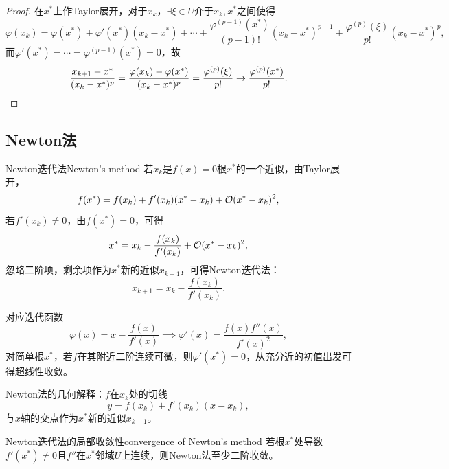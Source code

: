 \begin{proof}
    在$x^*$上作Taylor展开，对于$x_k$，$\exists\xi \in U$介于$x_k,x^*$之间使得
    \[
        \varphi(x_k) = \varphi(x^*) + \varphi'(x^*)(x_k - x^*) + \cdots + \frac{\varphi^{(p-1)}(x^*)}{(p - 1)!}(x_k - x^*)^{p-1} + \frac{\varphi^{(p)}(\xi)}{p!}(x_k - x^*)^p,
    \]
    而$\varphi'(x^*) = \cdots = \varphi^{(p-1)}(x^*) = 0$，故
    \[
        \frac{x_{k+1} - x^*}{(x_k - x^*)^p} = \frac{\varphi(x_k) - \varphi(x^*)}{(x_k - x^*)^p}
        = \frac{\varphi^{(p)}(\xi)}{p!} \to \frac{\varphi^{(p)}(x^*)}{p!}.
        \qedhere
    \]
\end{proof}

\subsection{Newton法}

\begin{theorem}
    {Newton迭代法}{Newton's method}
    若$x_k$是$f(x) = 0$根$x^*$的一个近似，由Taylor展开，
    \[
        f(x^*) = f(x_k) + f'(x_k)(x^* - x_k) + \mathcal{O}(x^* - x_k)^2,
    \]
    若$f'(x_k) \neq 0$，由$f(x^*) = 0$，可得
    \[
        x^* = x_k - \frac{f(x_k)}{f'(x_k)} + \mathcal{O}(x^* - x_k)^2,
    \]
    忽略二阶项，剩余项作为$x^*$新的近似$x_{k+1}$，可得Newton迭代法：
    \begin{equation}
        \label{eqn:Newton iter}
        x_{k+1} = x_k - \frac{f(x_k)}{f'(x_k)}.
    \end{equation}
\end{theorem}

\begin{corollary}
    对应迭代函数
    \[
        \varphi(x) = x - \frac{f(x)}{f'(x)} \implies \varphi'(x) = \frac{f(x)f''(x)}{f'(x)^2},
    \]
    对简单根$x^*$，若$f$在其附近二阶连续可微，则$\varphi'(x^*) = 0$，从充分近的初值出发可得超线性收敛。
\end{corollary}

\begin{remark}
    Newton法的几何解释：$f$在$x_k$处的切线
    \[
        y = f(x_k) + f'(x_k)(x - x_k),
    \]
    与$x$轴的交点作为$x^*$新的近似$x_{k+1}$。
\end{remark}

\begin{theorem}
    {Newton迭代法的局部收敛性}{convergence of Newton's method}
    若根$x^*$处导数$f'(x^*) \neq 0$且$f''$在$x^*$邻域$U$上连续，则Newton法至少二阶收敛。
\end{theorem}

